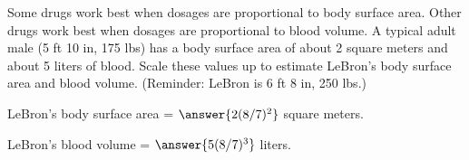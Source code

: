 \documentclass[nooutcomes]{ximera}
\begin{document}
\begin{problem}
Some drugs work best when dosages are proportional to body surface area.  Other drugs work best when dosages are proportional to blood volume.  A typical adult male (5 ft 10 in, 175 lbs)  has a body surface area of about 2 square meters and about 5 liters of blood.  Scale these values up to estimate LeBron's body surface area and blood volume.  (Reminder:  LeBron is 6 ft 8 in, 250 lbs.)

LeBron's body surface area = $\answer{2(8/7)^2}$ square meters. 

LeBron's blood volume = $\answer{5(8/7)^3}$ liters. 
\end{problem}

\end{document}
